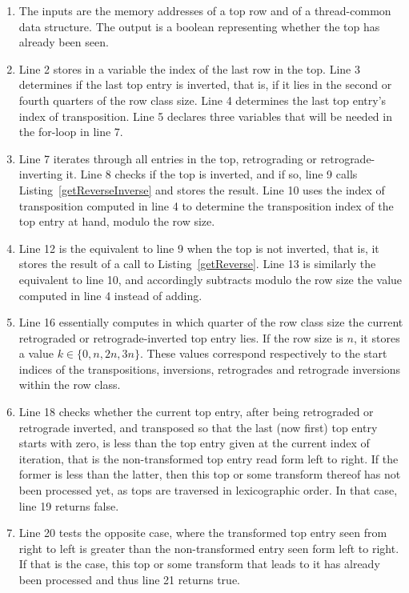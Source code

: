 \begin{enumerate}
\item The inputs are the memory addresses of a top row and of a thread-common data structure. The output is a boolean representing whether the top has already been seen.
\item Line 2 stores in a variable the index of the last row in the top. Line 3 determines if the last top entry is inverted, that is, if it lies in the second or fourth quarters of the row class size. Line 4 determines the last top entry's index of transposition. Line 5 declares three variables that will be needed in the for-loop in line 7.
\addtocounter{enumi}{4}
\item Line 7 iterates through all entries in the top, retrograding or retrograde-inverting it. Line 8 checks if the top is inverted, and if so, line 9 calls Listing~\ref{getReverseInverse} and stores the result. Line 10 uses the index of transposition computed in line 4 to determine the transposition index of the top entry at hand, modulo the row size.
\addtocounter{enumi}{4}
\item Line 12 is the equivalent to line 9 when the top is not inverted, that is, it stores the result of a call to Listing~\ref{getReverse}. Line 13 is similarly the equivalent to line 10, and accordingly subtracts modulo the row size the value computed in line 4 instead of adding.
\addtocounter{enumi}{3}
\item Line 16 essentially computes in which quarter of the row class size the current retrograded or retrograde-inverted top entry lies. If the row size is $n$, it stores a value $k \in \{0, n, 2n, 3n\}$. These values correspond respectively to the start indices of the transpositions, inversions, retrogrades and retrograde inversions within the row class.
\addtocounter{enumi}{1}
\item Line 18 checks whether the current top entry, after being retrograded or retrograde inverted, and transposed so that the last (now first) top entry starts with zero, is less than the top entry given at the current index of iteration, that is the non-transformed top entry read form left to right. If the former is less than the latter, then this top or some transform thereof has not been processed yet, as tops are traversed in lexicographic order. In that case, line 19 returns false.
\addtocounter{enumi}{1}
\item Line 20 tests the opposite case, where the transformed top entry seen from right to left is greater than the non-transformed entry seen form left to right. If that is the case, this top or some transform that leads to it has already been processed and thus line 21 returns true.

\end{enumerate}
